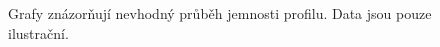 \begin{figure}[H]
	\caption{Grafy znázorňují nevhodný průběh jemnosti profilu. Data jsou pouze ilustrační.}
	\end{figure}
	

